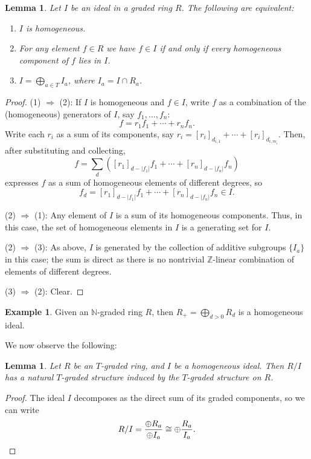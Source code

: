 \documentclass{amsart}[12pt]
\newcommand{\Z}{\mathbb{Z}}
\newcommand{\NN}{\mathbb{N}}
\numberwithin{equation}{section}
\theoremstyle{plain} %
\newtheorem{lem}[equation]{Lemma}
\newtheorem{lemma}[equation]{Lemma}
\theoremstyle{definition}
\newtheorem{example}[equation]{Example}
\theoremstyle{remark}
\begin{document}
\begin{lem} Let $I$ be an ideal in a graded ring $R$.
The following are equivalent:
	
	\begin{enumerate}
	\item $I$ is homogeneous.
	\item  For any element $f\in R$ we have $f\in I$ if and only if every homogeneous component of $f$ lies in $I$. 
	\item $I = \bigoplus_{a \in T} I_a$, where $I_a = I \cap R_a$.
	\end{enumerate}
	\end{lem}
	\begin{proof}
	(1) $\Rightarrow$ (2):  If $I$ is homogeneous and $f\in I$, write $f$ as a combination of the (homogeneous) generators of $I$, say $f_1, \ldots, f_n$:
\[f = r_1 f_1 + \cdots + r_n f_n.\]
Write each $r_i$ as a sum of its components, say $r_i = [r_i]_{d_{i,1}} + \cdots + [r_i]_{d_{i,m_i}} $. Then, after substituting and collecting, 
\[ f= \sum_{d} ( [r_1]_{d-|f_1|} f_1 + \cdots +   [r_n]_{d-|f_n|} f_n)\]
expresses $f$ as a sum of homogeneous elements of different degrees, so 
\[ f_d =  [r_1]_{d-|f_1|} f_1 + \cdots +   [r_n]_{d-|f_n|} f_n \in I.\]

(2) $\Rightarrow$ (1): Any element of $I$ is a sum of its homogeneous components. Thus, in this case, the set of homogeneous elements in $I$ is a generating set for $I$.

(2) $\Rightarrow$ (3): As above, $I$ is generated by the collection of additive subgroups $\{I_a\}$ in this case; the sum is direct as there is no nontrivial $\Z$-linear combination of elements of different degrees.

(3) $\Rightarrow$ (2): Clear.
\end{proof}
	


\begin{example}
Given an $\NN$-graded ring $R$, then $R_+=\bigoplus_{d>0} R_d$ is a homogeneous ideal.
\end{example}


We now observe the following:

\begin{lemma}
	Let $R$ be an $T$-graded ring, and $I$ be a homogeneous ideal. Then $R/I$ has a natural $T$-graded structure induced by the $T$-graded structure on $R$.
\end{lemma}

\begin{proof}
	The ideal $I$ decomposes as the direct sum of its graded components, so we can write
	\[R/I = \frac{\oplus R_a}{\oplus I_a} \cong \oplus \frac{R_a}{I_a}. \qedhere\]
\end{proof}
\end{document}
